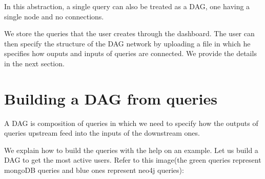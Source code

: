 \documentclass[letterpaper,10pt,english]{sphinxmanual}
\begin{document}
In this abstraction, a single query can also be treated as a DAG, one having a single node and no connections.

We store the queries that the user creates through the dashboard. The user can then specify the structure of the DAG network by uploading a file in which he specifies how ouputs and inputs of queries are connected. We provide the details in the next section.


\section{Building a DAG from queries}
\label{\detokenize{dag:building-a-dag-from-queries}}
A DAG is composition of queries in which we need to specify how the outputs of queries upstream feed into the inputs of the downstream ones.

We explain how to build the queries with the help on an example. Let us build a DAG to get the most active users. Refer to this image(the green queries represent mongoDB queries and blue ones represent neo4j queries):

\noindent{}
\end{document}
